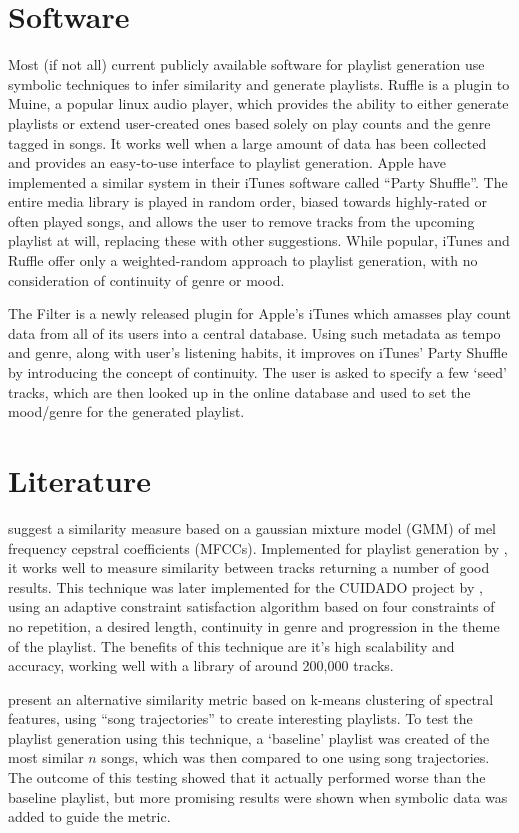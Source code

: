 \section{Software}
Most (if not all) current publicly available software for playlist generation use symbolic techniques to infer similarity and generate playlists. Ruffle is a plugin to Muine, a popular linux audio player, which provides the ability to either generate playlists or extend user-created ones based solely on play counts and the genre tagged in songs. It works well when a large amount of data has been collected and provides an easy-to-use interface to playlist generation. Apple have implemented a similar system in their iTunes software called ``Party Shuffle''. The entire media library is played in random order, biased towards highly-rated or often played songs, and allows the user to remove tracks from the upcoming playlist at will, replacing these with other suggestions. While popular, iTunes and Ruffle offer only a weighted-random approach to playlist generation, with no consideration of continuity of genre or mood.

The Filter is a newly released plugin for Apple's iTunes which amasses play count data from all of its users into a central database. Using such metadata as tempo and genre, along with user's listening habits, it improves on iTunes' Party Shuffle by introducing the concept of continuity. The user is asked to specify a few `seed' tracks, which are then looked up in the online database and used to set the mood/genre for the generated playlist.
\section{Literature}
\citet*{Aucouturier2002a} suggest a similarity measure based on a gaussian mixture model (GMM) of mel frequency cepstral coefficients (MFCCs). Implemented for playlist generation by \citet{Schnitzer2003}, it works well to measure similarity between tracks returning a number of good results. This technique was later implemented for the CUIDADO project by \citet*{Aucouturier2003}, using an adaptive constraint satisfaction algorithm based on four constraints of no repetition, a desired length, continuity in genre and progression in the theme of the playlist. The benefits of this technique are it's high scalability and accuracy, working well with a library of around 200,000 tracks.

\citet{Logan2001} present an alternative similarity metric based on k-means clustering of spectral features, using ``song trajectories'' to create interesting playlists. To test the playlist generation using this technique, a `baseline' playlist was created of the most similar $n$ songs, which was then compared to one using song trajectories. The outcome of this testing showed that it actually performed worse than the baseline playlist, but more promising results were shown when symbolic data was added to guide the metric.

